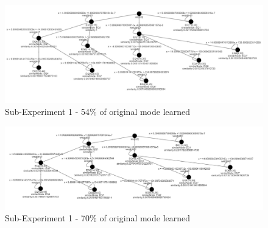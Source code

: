 \begin{figure}[h]
	\centering
	\includegraphics[scale=0.4]{./pictures/combination_experiment/learnedModel_worse.png}
	\caption{Sub-Experiment 1 - 54\% of original mode learned}
	\label{combination_experiment_1}
\end{figure}

\begin{figure}[h]
	\centering
	\includegraphics[scale=0.4]{./pictures/combination_experiment/learnedModel_better.png}
	\caption{Sub-Experiment 1 - 70\% of original mode learned}
	\label{combination_experiment_2}
\end{figure}


\newpage
